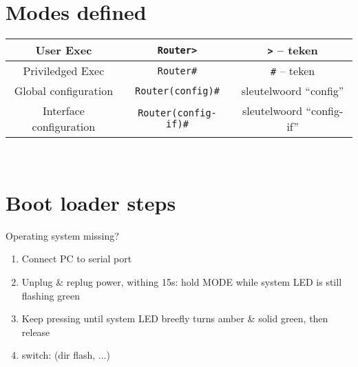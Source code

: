 \documentclass[10pt, a4paper]{article}
\begin{document}
\section{Modes defined}
\begin{tabular}{|c|c|c|}
\hline \rule[-1ex]{0pt}{4ex} User Exec & \texttt{Router>} & \texttt{>} -- teken \\
\hline \rule[-1ex]{0pt}{4ex} Priviledged Exec & \texttt{Router\#} & \texttt{\#} -- teken \\
\hline \rule[-1ex]{0pt}{4ex} Global configuration & \texttt{Router(config)\#} & sleutelwoord ``config'' \\
\hline \rule[-1ex]{0pt}{4ex} Interface configuration & \texttt{Router(config-if)\#} & sleutelwoord ``config-if'' \\
\hline
\end{tabular} \\

\section{Boot loader steps}
Operating system missing?
\begin{enumerate}
\item Connect PC to serial port
\item Unplug \& replug power, withing 15s: hold MODE while system LED is still flashing green
\item Keep pressing until system LED breefly turns amber \& solid green, then release
\item switch: (dir flash, ...)
\end{enumerate}
\end{document}
